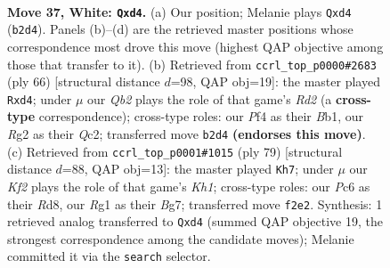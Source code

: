 \documentclass[11pt]{article}
\begin{document}
\clearpage

\begin{figure}[p]\centering
\begin{subfigure}{0.46\textwidth}\centering
\resizebox{\linewidth}{!}{%
\newchessgame
\chessboard[
  setfen={1r1rnk2/p1p5/2P2p2/8/3q1P1p/1P6/1Q1B1KRP/5BR1 w - - 0 37},
  showmover=false,
  pgfstyle=straightmove, color=movearrow, markmove={b2-d4}
]}
\caption{}
\end{subfigure}\hfill
\begin{subfigure}{0.46\textwidth}\centering
\resizebox{\linewidth}{!}{%
\newchessgame
\chessboard[
  setfen={8/p1nr1qk1/4p1p1/P3P1P1/3r1Pp1/6K1/2QR1R2/1B6 w - - 0 34},
  showmover=false,
  pgfstyle=straightmove, color=movearrow, markmove={d2-d4}
]}
\caption{}
\end{subfigure}
\\[4pt]
\begin{subfigure}{0.46\textwidth}\centering
\resizebox{\linewidth}{!}{%
\newchessgame
\chessboard[
  setfen={3rr2k/6b1/2q3pp/1pP5/1P1p2Q1/3N2P1/7P/3RR1K1 b - - 3 40},
  showmover=false,
  pgfstyle=straightmove, color=movearrow, markmove={h8-h7}
]}
\caption{}
\end{subfigure}\hfill

\caption{\textbf{Move 37, White: \texttt{Qxd4}.} (a) Our position; Melanie plays \texttt{Qxd4} (\texttt{b2d4}). Panels (b)--(d) are the retrieved master positions whose correspondence most drove this move (highest QAP objective among those that transfer to it). (b) Retrieved from \texttt{ccrl\_top\_p0000\#2683} (ply 66) [structural distance $d$=98, QAP obj=19]: the master played \texttt{Rxd4}; under $\mu$ our \emph{Qb2} plays the role of that game's \emph{Rd2} (a \textbf{cross-type} correspondence); cross-type roles: our \emph{P}f4 as their \emph{B}b1, our \emph{R}g2 as their \emph{Q}c2; transferred move \texttt{b2d4} \textbf{(endorses this move)}. (c) Retrieved from \texttt{ccrl\_top\_p0001\#1015} (ply 79) [structural distance $d$=88, QAP obj=13]: the master played \texttt{Kh7}; under $\mu$ our \emph{Kf2} plays the role of that game's \emph{Kh1}; cross-type roles: our \emph{P}c6 as their \emph{R}d8, our \emph{R}g1 as their \emph{B}g7; transferred move \texttt{f2e2}. Synthesis: 1 retrieved analog transferred to \texttt{Qxd4} (summed QAP objective 19, the strongest correspondence among the candidate moves); Melanie committed it via the \texttt{search} selector.}
\label{fig:thought-m72}
\end{figure}

\clearpage
\end{document}
